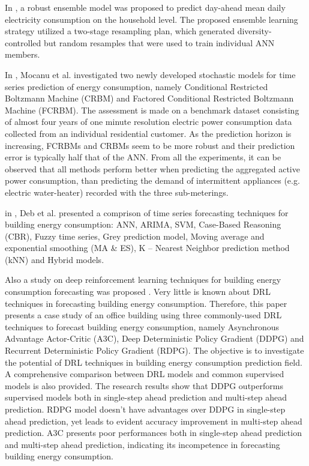 In \cite{ALOBAIDI2018997}, a robust ensemble model was proposed to predict day-ahead mean daily electricity consumption on the household level.
The proposed ensemble learning strategy utilized a two-stage resampling plan, which generated diversity-controlled but random resamples that were used to train individual ANN members.

In \cite{MOCANU201691}, Mocanu et al. investigated two newly developed stochastic models for time series prediction of energy consumption, namely Conditional Restricted Boltzmann Machine (CRBM) and Factored Conditional Restricted Boltzmann Machine (FCRBM).
The assessment is made on a benchmark dataset consisting of almost four years of one minute resolution electric power consumption data collected from an individual residential customer.
As the prediction horizon is increasing, FCRBMs and CRBMs seem to be more robust and their prediction error is typically half that of the ANN.
From all the experiments, it can be observed that all methods perform better when predicting the aggregated active power consumption, than predicting the demand of intermittent appliances (e.g. electric water-heater) recorded with the three sub-meterings.

in \cite{DEB2017902}, Deb et al. presented a comprison of time series forecasting techniques for building energy consumption: ANN, ARIMA, SVM, Case-Based Reasoning (CBR), Fuzzy time series, Grey prediction model, Moving average and exponential smoothing (MA \& ES), K – Nearest Neighbor prediction method (kNN) and Hybrid models.

Also a study on deep reinforcement learning techniques for building energy consumption forecasting was proposed \cite{LIU2020109675}.
Very little is known about DRL techniques in forecasting building energy consumption.
Therefore, this paper presents a case study of an office building using three commonly-used DRL techniques to forecast building energy consumption, namely Asynchronous Advantage Actor-Critic (A3C), Deep Deterministic Policy Gradient (DDPG) and Recurrent Deterministic Policy Gradient (RDPG).
The objective is to investigate the potential of DRL techniques in building energy consumption prediction field.
A comprehensive comparison between DRL models and common supervised models is also provided.
The research results show that DDPG outperforms supervised models both in single-step ahead prediction and multi-step ahead prediction.
RDPG model doesn’t have advantages over DDPG in single-step ahead prediction, yet leads to evident accuracy improvement in multi-step ahead prediction.
A3C presents poor performances both in single-step ahead prediction and multi-step ahead prediction, indicating its incompetence in forecasting building energy consumption.

